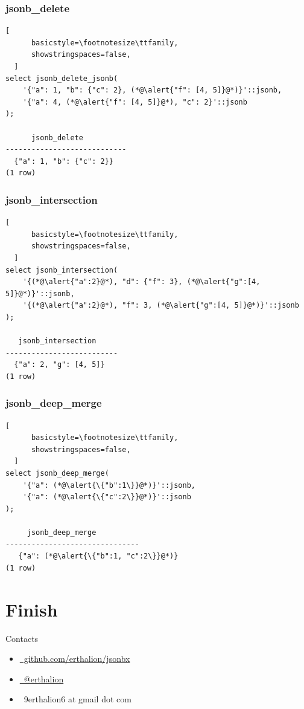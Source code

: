 \documentclass[14pt, compress, aspectratio=169]{beamer}
\def\twitter{{\FA \faTwitter}}
\def\github{{\FA \faGithubSign}}
\def\email{{\FA \faEnvelope}}
\begin{document}
\begin{frame}[fragile]
  \frametitle{jsonb\_delete}

  \begin{lstlisting}[
      basicstyle=\footnotesize\ttfamily,
      showstringspaces=false,
  ]
select jsonb_delete_jsonb(
    '{"a": 1, "b": {"c": 2}, (*@\alert{"f": [4, 5]}@*)}'::jsonb,
    '{"a": 4, (*@\alert{"f": [4, 5]}@*), "c": 2}'::jsonb
);

      jsonb_delete
----------------------------
  {"a": 1, "b": {"c": 2}}
(1 row)

  \end{lstlisting}

\end{frame}

\begin{frame}[fragile]
  \frametitle{jsonb\_intersection}

  \begin{lstlisting}[
      basicstyle=\footnotesize\ttfamily,
      showstringspaces=false,
  ]
select jsonb_intersection(
    '{(*@\alert{"a":2}@*), "d": {"f": 3}, (*@\alert{"g":[4, 5]}@*)}'::jsonb,
    '{(*@\alert{"a":2}@*), "f": 3, (*@\alert{"g":[4, 5]}@*)}'::jsonb
);

   jsonb_intersection
--------------------------
  {"a": 2, "g": [4, 5]}
(1 row)

  \end{lstlisting}

\end{frame}

\begin{frame}[fragile]
  \frametitle{jsonb\_deep\_merge}

  \begin{lstlisting}[
      basicstyle=\footnotesize\ttfamily,
      showstringspaces=false,
  ]
select jsonb_deep_merge(
    '{"a": (*@\alert{\{"b":1\}}@*)}'::jsonb,
    '{"a": (*@\alert{\{"c":2\}}@*)}'::jsonb
);

     jsonb_deep_merge            
-------------------------------
   {"a": (*@\alert{\{"b":1, "c":2\}}@*)}
(1 row)

  \end{lstlisting}

\end{frame}

\section{Finish}

\begin{frame}{Contacts}
    \begin{itemize}[label={}]
        \item \href{https://github.com/erthalion/jsonbx}{\github\ github.com/erthalion/jsonbx}
        \item \href{http://twitter.com/erthalion}{\twitter\ @erthalion}
        \item \email\ 9erthalion6 at gmail dot com
    \end{itemize}
\end{frame}

\end{document}
